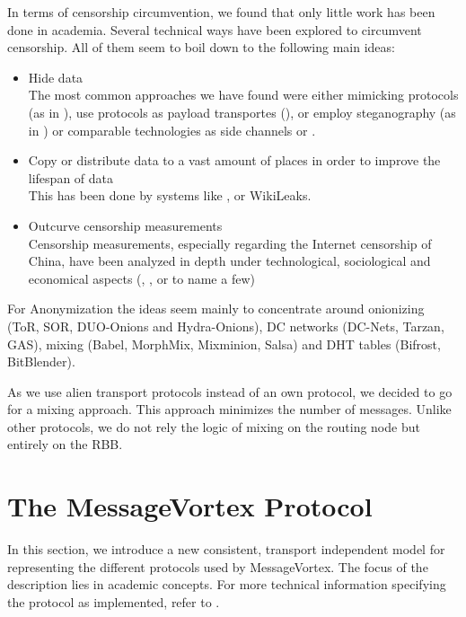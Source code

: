 \documentclass[10pt,journal,compsoc]{IEEEtran}
\begin{document}
In terms of censorship circumvention, we found that only little work has been done in academia. Several technical ways have been explored to circumvent censorship. All of them seem to boil down to the following main ideas:
\begin{itemize}
	\item Hide data\\
	      The most common approaches we have found were either mimicking protocols (as in \cite{mohajeri2013skypemorph}), use protocols as payload transportes (\cite{AthanRAM07}), or employ steganography (as in \cite{f5}) or comparable technologies as side channels or .
	\item Copy or distribute data to a vast amount of places in order to improve the lifespan of data\\
	      This has been done by systems like \cite{freenet}, or WikiLeaks.
	\item Outcurve censorship measurements\\
	      Censorship measurements, especially regarding the Internet censorship of China, have been analyzed in depth under technological, sociological and economical aspects (\cite{Ensafi_2015}, \cite{Clayton_2006}, or \cite{lowe2007great} to name a few)
\end{itemize}

For Anonymization the ideas seem mainly to concentrate around onionizing (ToR\cite{tor-spec}, SOR\cite{Egners_2012}, DUO-Onions and Hydra-Onions\cite{iwanik2005duo}), DC networks (DC-Nets\cite{chaum-dc}, Tarzan\cite{tarzan:ccs02}, GAS\cite{AthanRAM07}), mixing (Babel\cite{babel}, MorphMix\cite{morphmix:wpes2002}, Mixminion\cite{minion-design}, Salsa\cite{Salsa}) and DHT tables (Bifrost\cite{Kondo2009}, BitBlender\cite{Bauer_2008}).

As we use alien transport protocols instead of an own protocol, we decided to go for a mixing approach. This approach minimizes the number of messages. Unlike other protocols, we do not rely the logic of mixing on the routing node but entirely on the RBB. 

\section{The MessageVortex Protocol}
In this section, we introduce a new consistent, transport independent model for representing the different protocols used by MessageVortex. The focus of the description lies in academic concepts. For more technical information specifying the protocol as implemented, refer to \cite{MessageVortexRFC}. 
\end{document}
